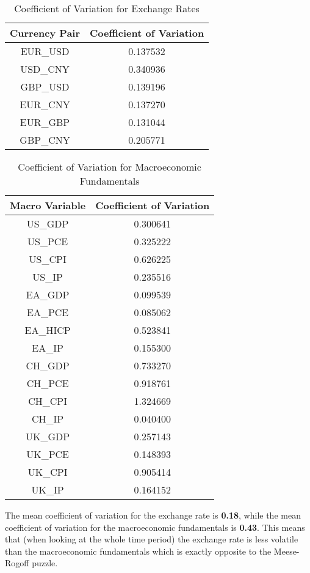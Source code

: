 \documentclass{article}
\begin{document}
\begin{table}[H]
    \centering
    \caption{Coefficient of Variation for Exchange Rates}
    \begin{tabular}{cc}
        \hline
        Currency Pair & Coefficient of Variation \\
        \hline
        EUR\_USD & 0.137532 \\
        USD\_CNY & 0.340936 \\
        GBP\_USD & 0.139196 \\
        EUR\_CNY & 0.137270 \\
        EUR\_GBP & 0.131044 \\
        GBP\_CNY & 0.205771 \\
        \hline
    \end{tabular}
\end{table}
\begin{table}[H]
    \centering
    \caption{Coefficient of Variation for Macroeconomic Fundamentals}
    \begin{tabular}{cc}
        \hline
        Macro Variable & Coefficient of Variation \\
        \hline
        US\_GDP & 0.300641 \\
        US\_PCE & 0.325222 \\
        US\_CPI & 0.626225 \\
        US\_IP & 0.235516 \\
        EA\_GDP & 0.099539 \\
        EA\_PCE & 0.085062 \\
        EA\_HICP & 0.523841 \\
        EA\_IP & 0.155300 \\
        CH\_GDP & 0.733270 \\
        CH\_PCE & 0.918761 \\
        CH\_CPI & 1.324669 \\
        CH\_IP & 0.040400 \\
        UK\_GDP & 0.257143 \\
        UK\_PCE & 0.148393 \\
        UK\_CPI & 0.905414 \\
        UK\_IP & 0.164152 \\
        \hline
    \end{tabular}
\end{table}

The mean coefficient of variation for the exchange rate is \textbf{0.18}, while the mean coefficient of variation for the macroeconomic fundamentals is \textbf{0.43}. This means that (when looking at the whole time period) the exchange rate is less volatile than the macroeconomic fundamentals which is exactly opposite to the Meese-Rogoff puzzle.
\end{document}
